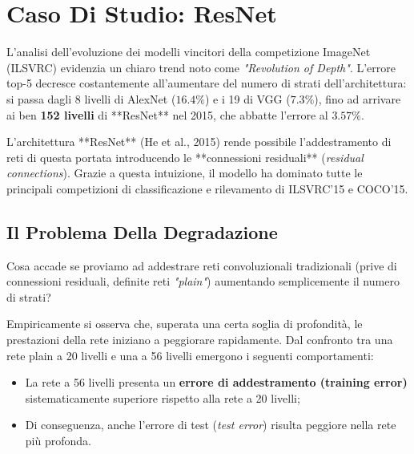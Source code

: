 ﻿\documentclass[11pt, a4paper]{article}
\begin{document}

\newpage

\section{Caso Di Studio: ResNet}

L'analisi dell'evoluzione dei modelli vincitori della competizione ImageNet (ILSVRC) evidenzia un chiaro trend noto come \emph{"Revolution of Depth"}. L'errore top-5 decresce costantemente all'aumentare del numero di strati dell'architettura: si passa dagli 8 livelli di AlexNet ($16.4\%$) e i 19 di VGG ($7.3\%$), fino ad arrivare ai ben \textbf{152 livelli} di **ResNet** nel 2015, che abbatte l'errore al \textbf{$3.57\%$}.


L'architettura **ResNet** (He et al., 2015) rende possibile l'addestramento di reti di questa portata introducendo le **connessioni residuali** (\emph{residual connections}). Grazie a questa intuizione, il modello ha dominato tutte le principali competizioni di classificazione e rilevamento di ILSVRC'15 e COCO'15.


\subsection{Il Problema Della Degradazione}

Cosa accade se proviamo ad addestrare reti convoluzionali tradizionali (prive di connessioni residuali, definite reti \emph{"plain"}) aumentando semplicemente il numero di strati?


Empiricamente si osserva che, superata una certa soglia di profondità, le prestazioni della rete iniziano a peggiorare rapidamente. Dal confronto tra una rete plain a 20 livelli e una a 56 livelli emergono i seguenti comportamenti:
\begin{itemize}
    \item La rete a 56 livelli presenta un \textbf{errore di addestramento (training error)} sistematicamente superiore rispetto alla rete a 20 livelli;
    \item Di conseguenza, anche l'errore di test (\emph{test error}) risulta peggiore nella rete più profonda.
\end{itemize}
\end{document}
